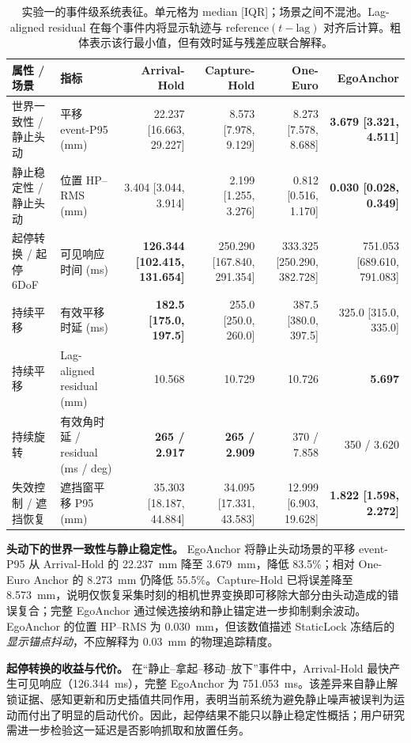 \documentclass[9pt,twocolumn,letterpaper]{extarticle}
\begin{document}
\begin{table}[t]
\centering
\caption{实验一的事件级系统表征。单元格为 median [IQR]；场景之间不混池。Lag-aligned residual 在每个事件内将显示轨迹与 $\mathrm{reference}(t-\mathrm{lag})$ 对齐后计算。粗体表示该行最小值，但有效时延与残差应联合解释。}
\label{tab:exp1-compact}
\scriptsize
\setlength{\tabcolsep}{3.2pt}
\begin{tabular}{llrrrr}
\toprule
属性 / 场景 & 指标 & Arrival-Hold & Capture-Hold & One-Euro & EgoAnchor \\
\midrule
世界一致性 / 静止头动 & 平移 event-P95 (mm) & 22.237 [16.663, 29.227] & 8.573 [7.978, 9.129] & 8.273 [7.578, 8.688] & \textbf{3.679 [3.321, 4.511]} \\
静止稳定性 / 静止头动 & 位置 HP--RMS (mm) & 3.404 [3.044, 3.914] & 2.199 [1.255, 3.276] & 0.812 [0.516, 1.170] & \textbf{0.030 [0.028, 0.349]} \\
起停转换 / 起停 6DoF & 可见响应时间 (ms) & \textbf{126.344 [102.415, 131.654]} & 250.290 [167.840, 291.354] & 333.325 [250.290, 382.728] & 751.053 [689.610, 791.083] \\
持续平移 & 有效平移时延 (ms) & \textbf{182.5 [175.0, 197.5]} & 255.0 [250.0, 260.0] & 387.5 [380.0, 397.5] & 325.0 [315.0, 335.0] \\
持续平移 & Lag-aligned residual (mm) & 10.568 & 10.729 & 10.726 & \textbf{5.697} \\
持续旋转 & 有效角时延 / residual (ms / deg) & \textbf{265 / 2.917} & \textbf{265 / 2.909} & 370 / 7.858 & 350 / 3.620 \\
失效控制 / 遮挡恢复 & 遮挡窗平移 P95 (mm) & 35.303 [18.187, 44.884] & 34.095 [17.331, 43.583] & 12.999 [6.903, 19.628] & \textbf{1.822 [1.598, 2.272]} \\
\bottomrule
\end{tabular}
\end{table}



\textbf{头动下的世界一致性与静止稳定性。}
EgoAnchor 将静止头动场景的平移 event-P95 从 Arrival-Hold 的 22.237~mm 降至 3.679~mm，降低 83.5\%；相对 One-Euro Anchor 的 8.273~mm 仍降低 55.5\%。Capture-Hold 已将误差降至 8.573~mm，说明仅恢复采集时刻的相机世界变换即可移除大部分由头动造成的错误复合；完整 EgoAnchor 通过候选接纳和静止锚定进一步抑制剩余波动。EgoAnchor 的位置 HP--RMS 为 0.030~mm，但该数值描述 StaticLock 冻结后的\emph{显示锚点抖动}，不应解释为 0.03~mm 的物理追踪精度。

\textbf{起停转换的收益与代价。}
在“静止--拿起--移动--放下”事件中，Arrival-Hold 最快产生可见响应（126.344~ms），完整 EgoAnchor 为 751.053~ms。该差异来自静止解锁证据、感知更新和历史插值共同作用，表明当前系统为避免静止噪声被误判为运动而付出了明显的启动代价。因此，起停结果不能只以静止稳定性概括；用户研究需进一步检验这一延迟是否影响抓取和放置任务。
\end{document}

